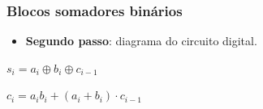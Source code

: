 \documentclass{beamer}
\begin{document}

\begin{frame}
\frametitle{Blocos somadores binários}

\begin{itemize}

\item \textbf{Segundo passo}: diagrama do circuito digital.

\end{itemize}

\begin{minipage}{0.47\textwidth}
\hspace{4ex} $s_i = a_i \oplus b_i \oplus c_{i-1}$
\end{minipage}
%
\begin{minipage}{0.47\textwidth}
$c_i = a_i b_i + (a_i + b_i ) \cdot c_{i-1}$
\end{minipage}


\end{frame}
\end{document}
